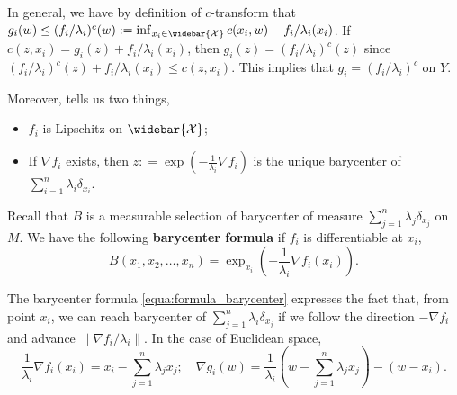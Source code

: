 \begin{rmk}
	In general, we have by definition of $c$-transform that
	$g_i(w) \leq (f_i / \lambda_i)^c(w) := \inf_{x_i \in \widebar{ \mathcal{X} } } c(x_i, w) - f_i / \lambda_i (x_i)$.
	If $ c(z, x_i) = g_i (z) + f_i / \lambda_i (x_i)$,
	then
	$g_i(z) = (f_i / \lambda_i)^c (z)$ since $(f_i / \lambda_i)^c(z) + f_i / \lambda_i(x_i) \leq c (z, x_i)$.
	This implies that $g_i = (f_i / \lambda_i)^c$ on $Y$.
\end{rmk}

Moreover,  tells us two things,
\begin{itemize}
	\item $f_i$ is Lipschitz on $\widebar{ \mathcal{X} }$;
	\item If $ \nabla f_i $ exists, then $z: = \exp( - \frac{1}{\lambda_i}\nabla f_i)$ is the
	      unique barycenter of $\sum_{i=1}^n \lambda_i \delta_{x_i}$.
\end{itemize}
Recall that $B$ is a measurable selection of barycenter of
measure $\sum_{j=1}^{n} \lambda_j \delta_{x_j}$ on $M$.
We have the following \textbf{barycenter formula}
if $f_i$ is differentiable at $x_i$,
\begin{equation}
	\label{equa:formula_barycenter}
	B(x_1, x_2, \ldots, x_n) = \exp_{x_i} (- \frac{1}{\lambda_i} \nabla f_i(x_i)).
\end{equation}

The barycenter formula \cref{equa:formula_barycenter} expresses the fact that,
from point $x_i$,
we can reach barycenter of $\sum_{j=1}^n \lambda_i \delta_{x_j}$ if we follow the direction $-\nabla f_i$
and advance $\| \nabla f_i / \lambda_i \| $.
In the case of Euclidean space,
\[
	\frac{1}{\lambda_i} \nabla f_i(x_i) = x_i - \sum_{j=1}^n \lambda_j x_j;                              \quad
	\nabla g_i(w)  = \frac{1}{\lambda_i} (w - \sum_{j=1}^n \lambda_j x_j) -(w-x_i).
\]


